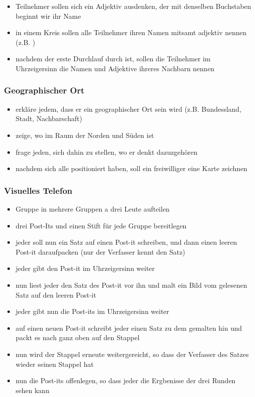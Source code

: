 \begin{itemize}
  \item Teilnehmer sollen sich ein Adjektiv ausdenken, der mit denselben Buchstaben beginnt wir
    ihr Name
  \item in einem Kreis sollen alle Teilnehmer ihren Namen mitsamt adjektiv nennen (z.B.
    )
  \item nachdem der erste Durchlauf durch ist, sollen die Teilnehmer im Uhrzeigersinn die
    Namen und Adjektive ihreres Nachbarn nennen
\end{itemize}

\subsubsection{Geographischer Ort}
\begin{itemize}
  \item erkläre jedem, dass er ein geographischer Ort sein wird (z.B. Bundessland, Stadt,
    Nachbarschaft)
  \item zeige, wo im Raum der Norden und Süden ist
  \item frage jeden, sich dahin zu stellen, wo er denkt dazuzgehören
  \item nachdem sich alle positioniert haben, soll ein freiwilliger eine Karte
    zeichnen
\end{itemize}


\subsubsection{Visuelles Telefon}
\begin{itemize}
  \item Gruppe in mehrere Gruppen a drei Leute aufteilen
  \item drei Post-Its und einen Stift für jede Gruppe bereitlegen
  \item jeder soll nun ein Satz auf einen Post-it schreiben, und dann einen leeren Post-it
    daraufpacken (nur der Verfasser kennt den Satz)
  \item jeder gibt den Post-it im Uhrzeigersinn weiter
  \item nun liest jeder den Satz des Post-it vor ihn und malt ein Bild vom
    gelesenen Satz auf den leeren Post-it
  \item jeder gibt nun die Post-its im Uhrzeigersinn weiter
  \item auf einen neuen Post-it schreibt jeder einen Satz zu dem gemalten
    hin und packt es nach ganz oben auf den Stappel
  \item nun wird der Stappel erneute weitergereicht, so dass der
    Verfasser des Satzes wieder seinen Stappel hat
  \item nun die Post-its offenlegen, so dass jeder die Ergbenisse
    der drei Runden sehen kann
\end{itemize}


